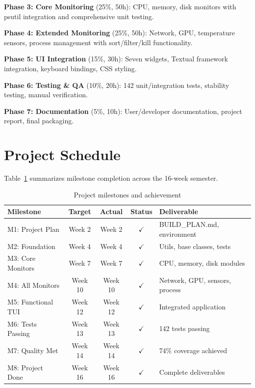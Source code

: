 \documentclass[12pt,a4paper,oneside]{report}
\begin{document}
\textbf{Phase 3: Core Monitoring} (25\%, 50h): CPU, memory, disk monitors with psutil integration and comprehensive unit testing.

\textbf{Phase 4: Extended Monitoring} (25\%, 50h): Network, GPU, temperature sensors, process management with sort/filter/kill functionality.

\textbf{Phase 5: UI Integration} (15\%, 30h): Seven widgets, Textual framework integration, keyboard bindings, CSS styling.

\textbf{Phase 6: Testing \& QA} (10\%, 20h): 142 unit/integration tests, stability testing, manual verification.

\textbf{Phase 7: Documentation} (5\%, 10h): User/developer documentation, project report, final packaging.

\section{Project Schedule}
\label{sec:schedule}

Table~\ref{tab:milestones} summarizes milestone completion across the 16-week semester.

\begin{table}[h]
\centering
\caption{Project milestones and achievement}
\label{tab:milestones}
\small
\begin{tabular}{|l|c|c|c|l|}
\hline
\textbf{Milestone} & \textbf{Target} & \textbf{Actual} & \textbf{Status} & \textbf{Deliverable} \\
\hline
M1: Project Plan & Week 2 & Week 2 & $\checkmark$ & BUILD\_PLAN.md, environment \\
M2: Foundation & Week 4 & Week 4 & $\checkmark$ & Utils, base classes, tests \\
M3: Core Monitors & Week 7 & Week 7 & $\checkmark$ & CPU, memory, disk modules \\
M4: All Monitors & Week 10 & Week 10 & $\checkmark$ & Network, GPU, sensors, process \\
M5: Functional TUI & Week 12 & Week 12 & $\checkmark$ & Integrated application \\
M6: Tests Passing & Week 13 & Week 13 & $\checkmark$ & 142 tests passing \\
M7: Quality Met & Week 14 & Week 14 & $\checkmark$ & 74\% coverage achieved \\
M8: Project Done & Week 16 & Week 16 & $\checkmark$ & Complete deliverables \\
\hline
\end{tabular}
\end{table}
\end{document}
